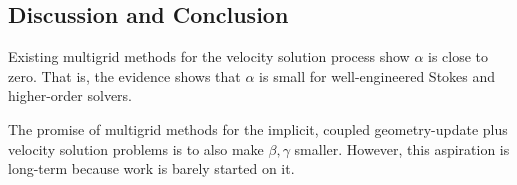 \documentclass[twocolumn,letterpaper]{igs}
\begin{document}
\subsection{Discussion and Conclusion}

Existing multigrid methods for the velocity solution process show $\alpha$ is close to zero.  That is, the evidence shows that $\alpha$ is small for well-engineered Stokes \citep{IsaacStadlerGhattas2015} and higher-order \citep{BrownSmithAhmadia2013} solvers.

The promise of multigrid methods for the implicit, coupled geometry-update plus velocity solution problems is to also make $\beta,\gamma$ smaller.  However, this aspiration is long-term because work is barely started on it.



\end{document}
